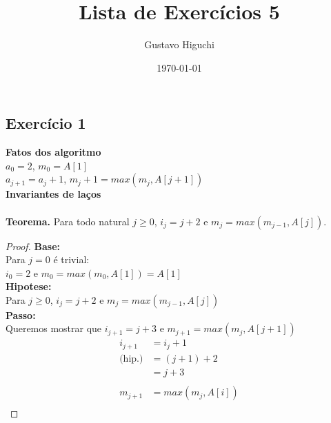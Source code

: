 \documentclass{article}
\title{Lista de Exercícios 5}
\author{Gustavo Higuchi}
\date{\today}
\begin{document}
\maketitle

\tableofcontents
\newpage


\chapter{}

\section{Exercício 1}
    \textbf{Fatos dos algoritmo} \\
    \hspace*{30pt} $a_0 = 2$,\hspace{30pt} $m_0 = A[1]$ \\
    \hspace*{30pt} $a_{j+1} = a_j + 1$, $m_j+1 = max(m_{j}, A[j+1])$\\
    \textbf{Invariantes de laços} \\
    \\
    \textbf{Teorema.} Para todo natural $j \geq 0$, $i_j = j + 2$ e $m_j = max(m_{j-1}, A[j])$.
    
    \begin{proof}
        \hfill \break
        \textbf{Base:} \\
        \hspace*{30pt} Para $j = 0$ é trivial:\\
        \hspace*{30pt} $i_0 = 2$ e $m_0 = max(m_0, A[1]) = A[1]$\\
        \textbf{Hipotese:}\\
        \hspace*{30pt} Para $j \geq 0$, $i_j = j + 2$ e $m_j = max(m_{j-1}, A[j])$\\
        \textbf{Passo:}\\
        \hspace*{30pt} Queremos mostrar que $i_{j+1} = j + 3$ e $m_{j+1} = max(m_j, A[j+1])$\\
        \begin{equation}
            \begin{split}
                i_{j+1} & = i_j + 1\\
                \text{(hip.)} & = (j + 1) + 2\\
                & = j + 3\\
                \\
                m_{j+1} & = max(m_j, A[i])\\
            \end{split}
        \end{equation}
    \end{proof}
\end{document}
